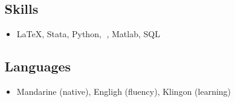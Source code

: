 \subsection*{\faBug\,Skills}
\begin{itemize}
    \item[]  \LaTeX, Stata, {\faBrands Python}, {\faBrands }, Matlab, SQL

\end{itemize}


\subsection*{\faLanguage\,Languages}

\begin{itemize}
    \item[] Mandarine (native), Engligh (fluency), Klingon (learning)
\end{itemize}

